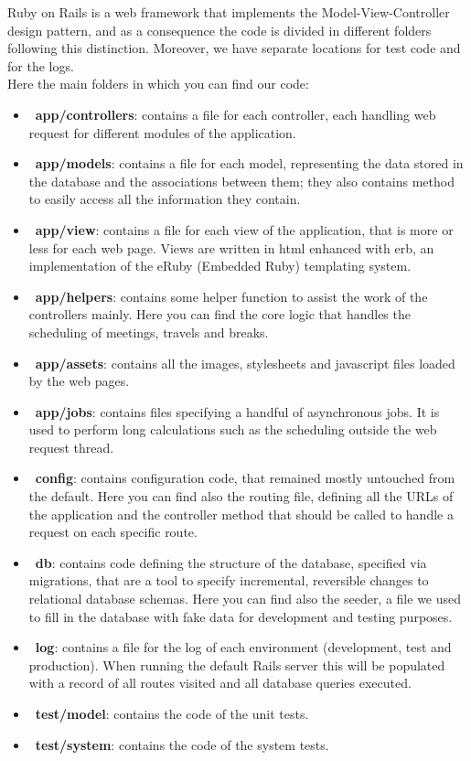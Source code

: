 Ruby on Rails is a web framework that implements the Model-View-Controller design pattern, and as a consequence the code is divided in different folders following this distinction. Moreover, we have separate locations for test code and for the logs. \\
Here the main folders in which you can find our code:

\begin{itemize}
\item~\textbf{app/controllers}: contains a file for each controller, each handling web request for different modules of the application.
\item~\textbf{app/models}: contains a file for each model, representing the data stored in the database and the associations between them; they also contains method to easily access all the information they contain.
\item~\textbf{app/view}: contains a file for each view of the application, that is more or less for each web page. Views are written in html enhanced with erb, an implementation of the eRuby (Embedded Ruby) templating system.
\item~\textbf{app/helpers}: contains some helper function to assist the work of the controllers mainly. Here you can find the core logic that handles the scheduling of meetings, travels and breaks. 
\item~\textbf{app/assets}: contains all the images, stylesheets and javascript files loaded by the web pages.
\item~\textbf{app/jobs}: contains files specifying a handful of asynchronous jobs. It is used to perform long calculations such as the scheduling outside the web request thread.
\item~\textbf{config}: contains configuration code, that remained mostly untouched from the default. Here you can find also the routing file, defining all the URLs of the application and the controller method that should be called to handle a request on each specific route.
\item~\textbf{db}: contains code defining the structure of the database, specified via migrations, that are a tool to specify incremental, reversible changes to relational database schemas. Here you can find also the seeder, a file we used to fill in the database with fake data for development and testing purposes.
\item~\textbf{log}: contains a file for the log of each environment (development, test and production). When running the default Rails server this will be populated with a record of all routes visited and all database queries executed.
\item~\textbf{test/model}: contains the code of the unit tests.
\item~\textbf{test/system}: contains the code of the system tests.
\end{itemize}